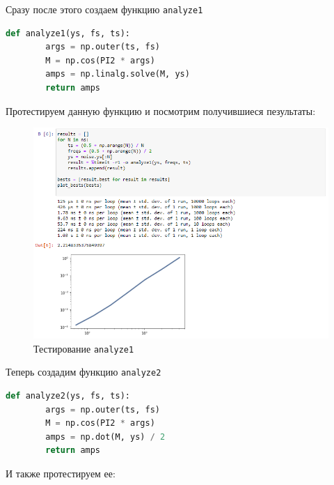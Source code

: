\documentclass[a4paper]{article}
\begin{document}
            Сразу после этого создаем функцию \texttt{analyze1}
            
\begin{lstlisting}[language=Python, caption= Функция \texttt{analyze1}]
    def analyze1(ys, fs, ts):
        args = np.outer(ts, fs)
        M = np.cos(PI2 * args)
        amps = np.linalg.solve(M, ys)
        return amps
\end{lstlisting}
            
            Протестируем данную функцию и посмотрим получившиеся пезультаты:
            
            \begin{figure}[H]
                \centering
                \includegraphics[width=\textwidth]{ex_1_analyze1_result.png}
                \caption{Тестирование \texttt{analyze1}}
                \label{fig:ex_1_analyze1_result}
            \end{figure}
            
            Теперь создадим функцию \texttt{analyze2}
            
\begin{lstlisting}[language=Python, caption= Функция \texttt{analyze2}]
    def analyze2(ys, fs, ts):
        args = np.outer(ts, fs)
        M = np.cos(PI2 * args)
        amps = np.dot(M, ys) / 2
        return amps
\end{lstlisting}
            
            И также протестируем ее:
            
\end{document}

